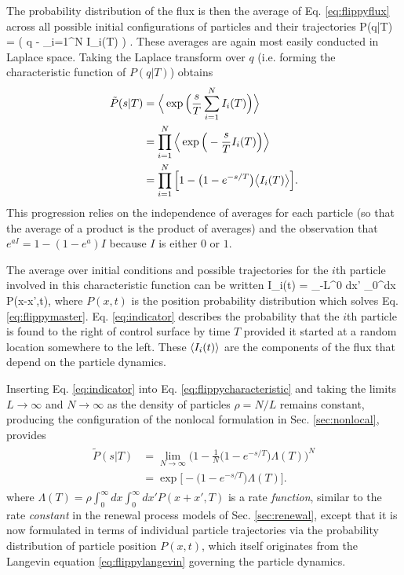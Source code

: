The probability distribution of the flux is then the average of Eq. \ref{eq:flippyflux} across all possible initial configurations of particles and their trajectories
\be P(q|T) = \Big \bra \delta\Big( q - \sum_{i=1}^N I_i(T) \Big) \Big\ket. \ee
These averages are again most easily conducted in Laplace space. 
Taking the Laplace transform over $q$ (i.e. forming the characteristic function of $P(q|T)$) obtains
\begin{align} 
\begin{split}
\tilde{P}(s|T) &=  \Big\langle \exp\Big(\frac{s}{T}\sum_{i=1}^N I_i(T)\Big)\Big\rangle \\
	&=  \prod_{i=1}^N \Big\langle \exp\Big(-\frac{s}{T}I_i(T)\Big)\Big\rangle \\
	&= \prod_{i=1}^N \Big[1-\big(1-e^{-s/T}\big)\big\langle I_i(T) \big\rangle \Big].
\end{split}
\label{eq:flippycharacteristic}
\end{align}
This progression relies on the independence of averages for each particle (so that the average of a product is the product of averages) and the observation that  $e^{a I} = 1-(1-e^a)I$ because $I$ is either $0$ or $1$.

The average over initial conditions and possible trajectories for the $i$th particle involved in this characteristic function can be written
\be \bra I_i(t) \ket = \int_{-L}^0 dx' \int_0^\infty dx P(x-x',t), \label{eq:indicator} \ee
where $P(x,t)$ is the position probability distribution which solves Eq. \ref{eq:flippymaster}.
Eq. \ref{eq:indicator} describes the probability that the $i$th particle is found to the right of control surface by time $T$ provided it started at a random location somewhere to the left.
These $\langle I_i(t) \rangle$ are the components of the flux that depend on the particle dynamics. 

Inserting Eq. \ref{eq:indicator} into Eq. \ref{eq:flippycharacteristic} and taking the limits $L\rightarrow \infty$ and $N \rightarrow \infty$ as the density of particles $\rho = N/L$ remains constant, producing the configuration of the nonlocal formulation in Sec. \ref{sec:nonlocal}, provides
\begin{align}
\begin{split} \tilde{P}(s|T) &= \lim_{N \rightarrow \infty} \Big(1 - \frac{1}{N}\big(1-e^{-s/T}\big)\Lambda(T) \Big)^N \\ &= \exp \Big[ -\big(1-e^{-s/T}\big)\Lambda(T) \Big]. 
\end{split}
\label{eq:flippychar} 
\end{align}
where $\Lambda(T) = \rho \int_0^\infty dx \int_0^\infty dx' P(x+x',T)$ is a rate \textit{function}, similar to the rate \textit{constant} in the renewal process models of Sec. \ref{sec:renewal}, except that it is now formulated in terms of individual particle trajectories via the probability distribution of particle position $P(x,t)$, which itself originates from the Langevin equation \ref{eq:flippylangevin} governing the particle dynamics.


